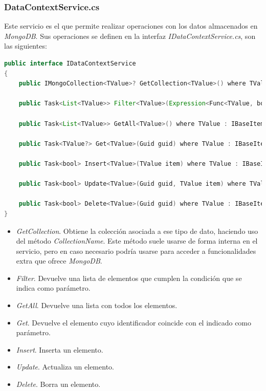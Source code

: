 \subsubsection{DataContextService.cs}

Este servicio es el que permite realizar operaciones con los datos almacenados en \textit{MongoDB}. Sus operaciones se definen en la interfaz \textit{IDataContextService.cs}, son las siguientes:

\begin{lstlisting}[language=java]
public interface IDataContextService
{
    public IMongoCollection<TValue>? GetCollection<TValue>() where TValue : IBaseItem;

    public Task<List<TValue>> Filter<TValue>(Expression<Func<TValue, bool>> filter) where TValue : IBaseItem;

    public Task<List<TValue>> GetAll<TValue>() where TValue : IBaseItem;

    public Task<TValue?> Get<TValue>(Guid guid) where TValue : IBaseItem;

    public Task<bool> Insert<TValue>(TValue item) where TValue : IBaseItem;

    public Task<bool> Update<TValue>(Guid guid, TValue item) where TValue : IBaseItem;

    public Task<bool> Delete<TValue>(Guid guid) where TValue : IBaseItem;
}
\end{lstlisting}

\begin{itemize}
	\item \textit{GetCollection}. Obtiene la colección asociada a ese tipo de dato, haciendo uso del método \textit{CollectionName}. Este método suele usarse de forma interna en el servicio, pero en caso necesario podría usarse para acceder a funcionalidades extra que ofrece \textit{MongoDB}.
	\item \textit{Filter}. Devuelve una lista de elementos que cumplen la condición que se indica como parámetro.
	\item \textit{GetAll}. Devuelve una lista con todos los elementos.
	\item \textit{Get}. Devuelve el elemento cuyo identificador coincide con el indicado como parámetro.
	\item \textit{Insert}. Inserta un elemento.
	\item \textit{Update}. Actualiza un elemento.
	\item \textit{Delete}. Borra un elemento.
\end{itemize}


